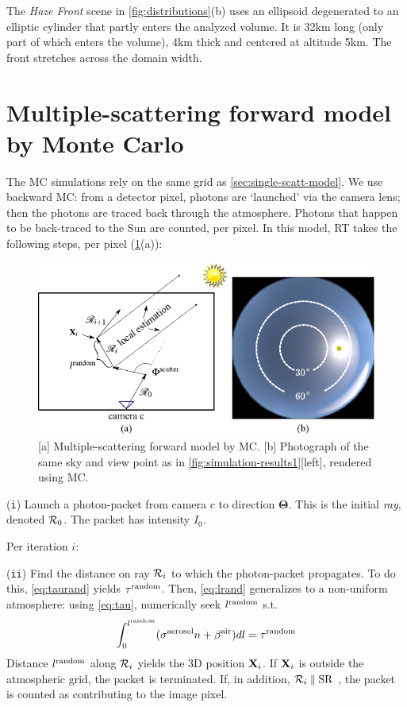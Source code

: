 \documentclass[10pt,letterpaper]{article}
\newcommand{\yoavcomment}[1]{}
\renewcommand{\yoavcomment}[1]{#1} %
\begin{document}
The {\em Haze Front} scene in \cref{fig:distributions}(b) uses an
ellipsoid degenerated to an elliptic cylinder that partly enters the
analyzed volume. It is 32km long (only part of which enters the
volume), 4km thick and centered at altitude 5km. The front stretches
across the domain width.

\section{Multiple-scattering forward model by Monte Carlo}
\label{sec:monte-carlo-simul}


The MC simulations rely on the same grid as
\cref{sec:single-scatt-model}. We use backward MC: from a detector
pixel, photons are `launched' via the camera lens; then the photons
are traced back through the atmosphere. Photons that happen to be
back-traced to the Sun are counted, per pixel. In this model, RT takes
the following steps, per pixel (\cref{fig:mcgrid}(a)):
\begin{figure}
  \centering
  \yoavcomment{\includegraphics{images/mcgrid.pdf}}
  \caption{\small [a] Multiple-scattering forward model by MC.
    [b] Photograph of the same sky and view point as in
    \cref{fig:simulation-results1}[left], rendered using MC.}
  \label{fig:mcgrid}
\end{figure}

\noindent ({\tt i}) Launch a photon-packet from camera $c$ to
direction ${\bm{\Theta}}$. This is the initial {\em ray}, denoted
${\cal R}_0$. The packet has intensity $I_0$.

\noindent Per iteration $i$:

\noindent ({\tt ii}) Find the distance on ray ${\cal R}_{i}$ to which
the photon-packet propagates. To do this, \cref{eq:taurand}
yields $\tau^{\rm random}$. Then, \cref{eq:lrand} generalizes to
a non-uniform atmosphere: using \cref{eq:tau}, numerically seek
$l^{\rm random}$ s.t.
\begin{align}
  \int_0^{l^{\rm random}}(\sigma^{\rm aerosol} n +\beta^{\rm air}) dl
  = \tau^{\rm random}
  \label{eq:MCextinct}
\end{align}
Distance $l^{\rm random}$ along ${\cal R}_{i}$ yields the 3D position ${\bf
  X}_{i}$.  If ${\bf X}_{i}$ is outside the atmospheric grid, the
packet is terminated. If, in addition, ${\cal R}_{i}\parallel {\rm
  SR}$ , the packet is counted as contributing to the image pixel.
\end{document}
